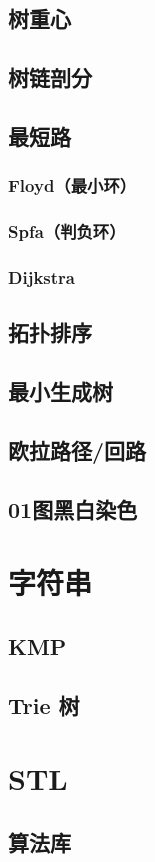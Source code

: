 \documentclass{article}
\begin{document}
\subsection{树重心}

\subsection{树链剖分}

\subsection{最短路}

\subsubsection{Floyd（最小环）}

\subsubsection{Spfa（判负环）}

\subsubsection{Dijkstra}

\subsection{拓扑排序}

\subsection{最小生成树}

\subsection{欧拉路径/回路}

\subsection{01图黑白染色}

\section{字符串}

\subsection{KMP}

\subsection{Trie 树}

\section{STL}

\subsection{算法库}


\end{document}
